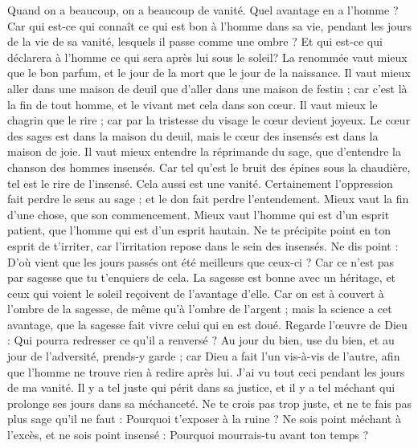 \begin{multicols}{2}
Quand on a beaucoup, on a beaucoup de vanité. Quel avantage en a l'homme ? 
Car qui est-ce qui connaît ce qui est bon à l'homme dans sa vie, pendant les jours de la vie de sa vanité, lesquels il passe comme une ombre ? Et qui est-ce qui déclarera à l'homme ce qui sera après lui sous le soleil?
\VerseOne{}La renommée vaut mieux que le bon parfum, et le jour de la mort que le jour de la naissance.
Il vaut mieux aller dans une maison de deuil que d'aller dans une maison de festin ; car c'est là la fin de tout homme, et le vivant met cela dans son cœur.
Il vaut mieux le chagrin que le rire ; car par la tristesse du visage le cœur devient joyeux.
Le cœur des sages est dans la maison du deuil, mais le cœur des insensés est dans la maison de joie.
Il vaut mieux entendre la réprimande du sage, que d'entendre la chanson des hommes insensés.
Car tel qu'est le bruit des épines sous la chaudière, tel est le rire de l'insensé. Cela aussi est une vanité. 
Certainement l'oppression fait perdre le sens au sage ; et le don fait perdre l'entendement. 
Mieux vaut la fin d'une chose, que son commencement. Mieux vaut l'homme qui est d'un esprit patient, que l'homme qui est d'un esprit hautain. 
Ne te précipite point en ton esprit de t'irriter, car l'irritation repose dans le sein des insensés.
Ne dis point : D'où vient que les jours passés ont été meilleurs que ceux-ci ? Car ce n'est pas par sagesse que tu t'enquiers de cela. 
La sagesse est bonne avec un héritage, et ceux qui voient le soleil reçoivent de l'avantage d'elle.
Car on est à couvert à l'ombre de la sagesse, de même qu'à l'ombre de l'argent ; mais la science a cet avantage, que la sagesse fait vivre celui qui en est doué. 
Regarde l'œuvre de Dieu : Qui pourra redresser ce qu'il a renversé ?
Au jour du bien, use du bien, et au jour de l'adversité, prends-y garde ; car Dieu a fait l’un vis-à-vis de l’autre, afin que l'homme ne trouve rien à redire après lui. 
J'ai vu tout ceci pendant les jours de ma vanité. Il y a tel juste qui périt dans sa justice, et il y a tel méchant qui prolonge ses jours dans sa méchanceté.
Ne te crois pas trop juste, et ne te fais pas plus sage qu'il ne faut : Pourquoi t’exposer à la ruine ?
Ne sois point méchant à l'excès, et ne sois point insensé : Pourquoi mourrais-tu avant ton temps ?

\end{multicols}
